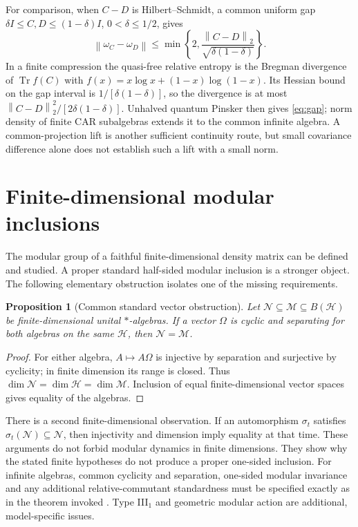 \documentclass[11pt]{article}
\newcommand{\Tr}{\operatorname{Tr}}
\newcommand{\norm}[1]{\left\|#1\right\|}
\newtheorem{proposition}[theorem]{Proposition}
\theoremstyle{definition}
\begin{document}
For comparison, when $C-D$ is Hilbert--Schmidt, a common uniform gap
$\delta I\le C,D\le(1-\delta)I$, $0<\delta\le1/2$, gives
\begin{equation}
\norm{\omega_C-\omega_D}
\le\min\left\{2,\frac{\norm{C-D}_2}{\sqrt{\delta(1-\delta)}}\right\}.
\label{eq:gap}
\end{equation}
In a finite compression the quasi-free relative entropy is the Bregman
divergence of $\Tr f(C)$ with
$f(x)=x\log x+(1-x)\log(1-x)$. Its Hessian bound on the gap interval is
$1/[\delta(1-\delta)]$, so the divergence is at most
$\norm{C-D}_2^2/[2\delta(1-\delta)]$. Unhalved quantum Pinsker \cite{pinsker} then
gives \eqref{eq:gap}; norm density of finite CAR subalgebras extends it
to the common infinite algebra. A common-projection lift is another
sufficient continuity route, but small covariance difference alone does
not establish such a lift with a small norm.

\section{Finite-dimensional modular inclusions}
\label{sec:modular-obstruction}
The modular group of a faithful finite-dimensional density matrix can be
defined and studied. A proper standard half-sided modular inclusion is a
stronger object. The following elementary obstruction isolates one of the
missing requirements.

\begin{proposition}[Common standard vector obstruction]
\label{prop:finite-modular}
Let $\mathcal N\subseteq\mathcal M\subseteq B(\mathcal H)$ be
finite-dimensional unital $*$-algebras. If a vector $\Omega$ is cyclic
and separating for both algebras on the same $\mathcal H$, then
$\mathcal N=\mathcal M$.
\end{proposition}
\begin{proof}
For either algebra, $A\mapsto A\Omega$ is injective by separation and
surjective by cyclicity; in finite dimension its range is closed. Thus
$\dim\mathcal N=\dim\mathcal H=\dim\mathcal M$. Inclusion of equal
finite-dimensional vector spaces gives equality of the algebras.
\end{proof}

There is a second finite-dimensional observation. If an automorphism
$\sigma_t$ satisfies $\sigma_t(\mathcal N)\subseteq\mathcal N$, then
injectivity and dimension imply equality at that time. These arguments
do not forbid modular dynamics in finite dimensions. They show why the
stated finite hypotheses do not produce a proper one-sided inclusion.
For infinite algebras, common cyclicity and separation, one-sided modular
invariance and any additional relative-commutant standardness must be
specified exactly as in the theorem invoked \cite{arakizsido}. Type III$_1$
and geometric modular action are additional, model-specific issues.
\end{document}
